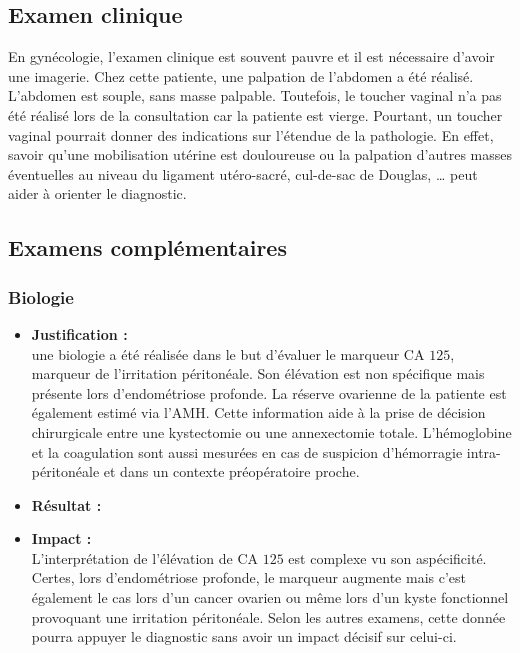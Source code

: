 \newpage

\subsection{Examen clinique} 
En gynécologie, l’examen clinique est souvent pauvre et il est nécessaire d’avoir une imagerie. Chez cette patiente, une palpation de l’abdomen a été réalisé. L’abdomen est souple, sans masse palpable. Toutefois, le toucher vaginal n’a pas été réalisé lors de la consultation car la patiente est vierge. Pourtant, un toucher vaginal pourrait donner des indications sur l’étendue de la pathologie. En effet, savoir qu’une mobilisation utérine est douloureuse ou la palpation d’autres masses éventuelles au niveau du ligament utéro-sacré, cul-de-sac de Douglas, \ldots{ } peut aider à orienter le diagnostic.

\subsection{Examens complémentaires}

\subsubsection{Biologie}
\begin{itemize}[label=\textbullet]
    \item \textbf{Justification :}\\
    une biologie a été réalisée dans le but d’évaluer le marqueur CA $125$, marqueur de l’irritation péritonéale. Son élévation est non spécifique mais présente lors d’endométriose profonde. La réserve ovarienne de la patiente est également estimé via l’AMH. Cette information aide à la prise de décision chirurgicale entre une kystectomie ou une annexectomie totale. L’hémoglobine et la coagulation sont aussi mesurées en cas de suspicion d’hémorragie intra-péritonéale et dans un contexte préopératoire proche.
    
    \item \textbf{Résultat :}%
        
        
    \item \textbf{Impact :}\\
    L’interprétation de l’élévation de CA $125$ est complexe vu son aspécificité. Certes, lors d’endométriose profonde, le marqueur augmente mais c’est également le cas lors d’un cancer ovarien ou même lors d’un kyste fonctionnel provoquant une irritation péritonéale. Selon les autres examens, cette donnée pourra appuyer le diagnostic sans avoir un impact décisif sur celui-ci.
    
\end{itemize}

